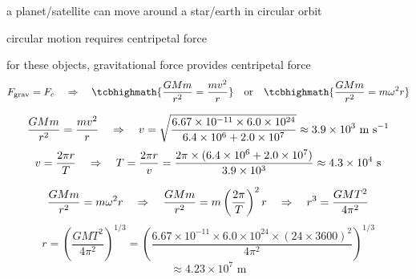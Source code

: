 a planet/satellite can move around a star/earth in circular orbit

circular motion requires centripetal force

for these objects, gravitational force provides centripetal force
\begin{equation*}
F_\text{grav} = F_c \RA
\tcbhighmath{\frac{GMm}{r^2} = \frac{mv^2}{r}} \quad \text{or} \quad \tcbhighmath{\frac{GMm}{r^2} = m \omega^2 r}
\end{equation*}


\begin{soln}
\begin{equation*}
\frac{GMm}{r^2} = \frac{mv^2}{r} \quad \Rightarrow \quad v = \sqrt{\frac{6.67\times10^{-11}\times6.0\times10^{24}}{6.4\times10^6+2.0\times10^7}} \approx 3.9\times10^3 \text{ m s$^{-1}$}
\end{equation*}
\begin{equation*}
v = \frac{2\pi r}{T} \quad \Rightarrow \quad T = \frac{2\pi r}{v} = \frac{2\pi\times(6.4\times10^6+2.0\times10^7)}{3.9\times10^3} \approx 4.3\times10^4 \text{ s}
\end{equation*}
\end{soln}


\begin{soln}
\begin{equation*}
\frac{GMm}{r^2} = m \omega^2 r \quad \Rightarrow \quad \frac{GMm}{r^2} = m\left(\frac{2\pi}{T}\right)^2 r \quad \Rightarrow \quad r^3 = \frac{GMT^2}{4\pi^2}
\end{equation*}
\begin{equation*}
r = \left( \frac{GMT^2}{4\pi^2} \right)^{1/3} = \left( \frac{6.67\times10^{-11} \times 6.0\times10^{24} \times (24\times3600)^2}{4\pi^2} \right)^{1/3} 
\end{equation*}
\begin{equation*}
    \approx 4.23\times10^7 \text{ m} 
\end{equation*}
\end{soln}

